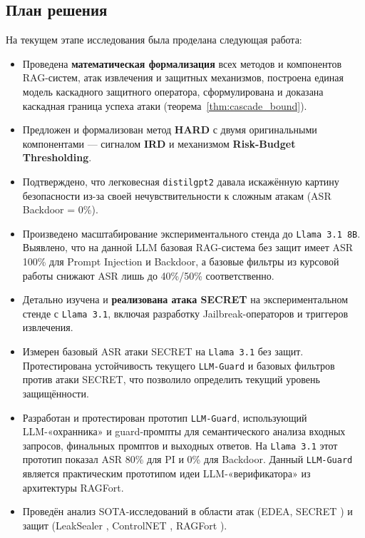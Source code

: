 \documentclass[12pt, a4paper]{article}
\theoremstyle{definition}
\theoremstyle{remark}
\begin{document}
\subsection{План решения}
\label{sec:solution_plan}

На текущем этапе исследования была проделана следующая работа:
\begin{itemize}[label=$\bullet$]
    \item Проведена \textbf{математическая формализация} всех методов и компонентов RAG-систем, атак извлечения и защитных механизмов, построена единая модель каскадного защитного оператора, сформулирована и доказана каскадная граница успеха атаки (теорема~\ref{thm:cascade_bound}).
    \item Предложен и формализован метод \textbf{HARD} с двумя оригинальными компонентами --- сигналом \textbf{IRD} и механизмом \textbf{Risk-Budget Thresholding}.
    \item Подтверждено, что легковесная \texttt{distilgpt2} давала искажённую картину безопасности из-за своей нечувствительности к сложным атакам (ASR Backdoor = 0\%).
    \item Произведено масштабирование экспериментального стенда до \texttt{Llama~3.1~8B}. Выявлено, что на данной LLM базовая RAG-система без защит имеет ASR 100\% для Prompt Injection и Backdoor, а базовые фильтры из курсовой работы снижают ASR лишь до 40\%/50\% соответственно.
    \item Детально изучена и \textbf{реализована атака SECRET} \cite{SECRET2025} на экспериментальном стенде с \texttt{Llama~3.1}, включая разработку Jailbreak-операторов и триггеров извлечения.
    \item Измерен базовый ASR атаки SECRET на \texttt{Llama~3.1} без защит. Протестирована устойчивость текущего \texttt{LLM-Guard} и базовых фильтров против атаки SECRET, что позволило определить текущий уровень защищённости.
    \item Разработан и протестирован прототип \texttt{LLM-Guard}, использующий LLM-«охранника» и guard-промпты для семантического анализа входных запросов, финальных промптов и выходных ответов. На \texttt{Llama~3.1} этот прототип показал ASR 80\% для PI и 0\% для Backdoor. Данный \texttt{LLM-Guard} является практическим прототипом идеи LLM-«верификатора» из архитектуры RAGFort.
    \item Проведён анализ SOTA-исследований в области атак (EDEA, SECRET \cite{SECRET2025}) и защит (LeakSealer \cite{LeakSealer2025}, ControlNET \cite{ControlNET2025}, RAGFort \cite{RAGFort2025}).
\end{itemize}
\end{document}
